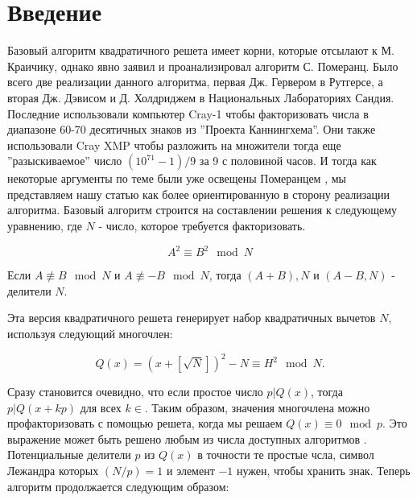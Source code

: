 \documentclass[a4paper,12pt]{report}
\begin{document}
\section{Введение}
Базовый алгоритм квадратичного решета имеет корни, которые отсылают к М. Краичику, однако явно заявил и проанализировал алгоритм С. Померанц. Было всего две реализации данного алгоритма, первая Дж. Гервером в Рутгерсе, а вторая Дж. Дэвисом и Д. Холдриджем в Национальных Лабораториях Сандия. Последние использовали компьютер Cray-1 чтобы факторизовать числа в диапазоне 60-70 десятичных знаков из ''Проекта Каннингхема''. Они также использовали Cray XMP чтобы разложить на множители тогда еще ''разыскиваемое'' число $(10^{71} -1)/9$ за 9 с половиной часов. И тогда как некоторые аргументы по теме были уже освещены Померанцем \cite{pomer}, мы представляем нашу статью как более ориентированную в сторону реализации алгоритма. Базовый алгоритм строится на составлении решения к следующему уравнению, где $N$ - число, которое требуется факторизовать.

\begin{equation}\label{eq:1}
A^2 \equiv B^2 \mod N
\end{equation}

Если $A \not\equiv B \mod N$ и $A \not\equiv -B \mod N$, тогда $(A + B), N$ и $(A - B, N)$ - делители $N$.

Эта версия квадратичного решета генерирует набор квадратичных вычетов $N$, используя следующий многочлен:

\begin{equation}\label{eq:2}
Q(x) = (x + [\sqrt{N}])^2 - N \equiv H^2 \mod N.
\end{equation}

Сразу становится очевидно, что если простое число $p | Q(x)$, тогда $p | Q(x + kp)$ для всех $k \in $. Таким образом, значения многочлена можно профакторизовать с помощью решета, когда мы решаем $Q(x) \equiv 0 \mod p$. Это выражение может быть решено любым из числа доступных алгоритмов \cite[стр 437]{knuth}. Потенциальные делители $p$ из $Q(x)$ в точности те простые чсла, символ Лежандра которых $(N/p) = 1$ и элемент $-1$ нужен, чтобы хранить знак. 
Теперь алгоритм продолжается следующим образом:
\end{document}
